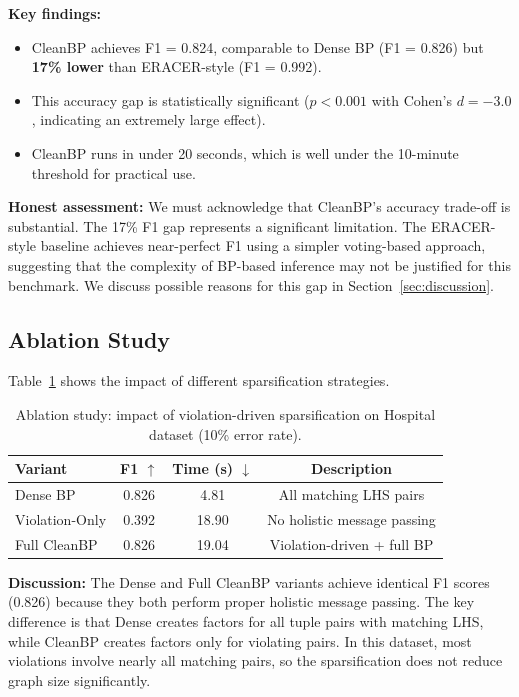 \documentclass{article}
\begin{document}
\textbf{Key findings:}
\begin{itemize}
    \item CleanBP achieves F1 = 0.824, comparable to Dense BP (F1 = 0.826) but \textbf{17\% lower} than ERACER-style (F1 = 0.992).
    \item This accuracy gap is statistically significant ($p < 0.001$ with Cohen's $d = -3.0$, indicating an extremely large effect).
    \item CleanBP runs in under 20 seconds, which is well under the 10-minute threshold for practical use.
\end{itemize}

\textbf{Honest assessment:} We must acknowledge that CleanBP's accuracy trade-off is substantial. The 17\% F1 gap represents a significant limitation. The ERACER-style baseline achieves near-perfect F1 using a simpler voting-based approach, suggesting that the complexity of BP-based inference may not be justified for this benchmark. We discuss possible reasons for this gap in Section~\ref{sec:discussion}.

\subsection{Ablation Study}

Table~\ref{tab:ablation} shows the impact of different sparsification strategies.

\begin{table}[t]
\centering
\caption{Ablation study: impact of violation-driven sparsification on Hospital dataset (10\% error rate).}
\label{tab:ablation}
\begin{tabular}{lccc}
\toprule
Variant & F1 $\uparrow$ & Time (s) $\downarrow$ & Description \\
\midrule
Dense BP & 0.826 & 4.81 & All matching LHS pairs \\
Violation-Only & 0.392 & 18.90 & No holistic message passing \\
Full CleanBP & 0.826 & 19.04 & Violation-driven + full BP \\
\bottomrule
\end{tabular}
\end{table}

\textbf{Discussion:} The Dense and Full CleanBP variants achieve identical F1 scores (0.826) because they both perform proper holistic message passing. The key difference is that Dense creates factors for all tuple pairs with matching LHS, while CleanBP creates factors only for violating pairs. In this dataset, most violations involve nearly all matching pairs, so the sparsification does not reduce graph size significantly.
\end{document}
